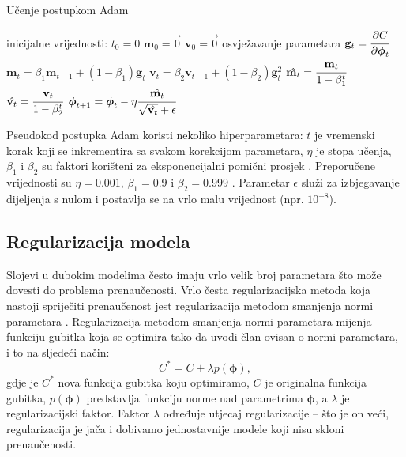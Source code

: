 \documentclass[times, utf8, diplomski, numeric]{fer}
\begin{document}
\begin{algorithm}[H]
\caption{Učenje postupkom Adam}
\label{alg:adam}
\begin{algorithmic}
\STATE inicijalne vrijednosti:
\STATE $t_0 = 0$ 
\STATE  $\mathbf{m}_0 = \vec{0}$
\STATE  $\mathbf{v}_0 = \vec{0}$
\STATE osvježavanje parametara
\STATE $\mathbf{g}_t = \cfrac{\partial C}{\partial \boldsymbol{\phi}_t}$
\STATE $\mathbf{m}_t = \beta_1 \mathbf{m}_{t-1} + (1 - \beta_1) \mathbf{g}_t$
\STATE $\mathbf{v}_t = \beta_2 \mathbf{v}_{t-1} + (1 - \beta_2) \mathbf{g}_t^2$
\STATE $\hat{\mathbf{m}_t} = \cfrac{\mathbf{m}_t}{1 - \beta_1^t}$
\STATE $\hat{\mathbf{v}_t} = \cfrac{\mathbf{v}_t}{1 - \beta_2^t}$
\STATE $\boldsymbol{\phi}_{t+1} = \boldsymbol{\phi}_t - \eta \cfrac{\hat{\mathbf{m}_t}}{\sqrt{\hat{\mathbf{v}_t}} + \epsilon}$
\end{algorithmic}
\end{algorithm}

Pseudokod postupka Adam koristi nekoliko hiperparametara: $t$ je vremenski korak koji se inkrementira sa svakom korekcijom parametara, $\eta$ je stopa učenja, $\beta_1$ i $\beta_2$ su faktori korišteni za
eksponencijalni pomični prosjek . Preporučene vrijednosti su $\eta=0.001$, $\beta_1=0.9$ i $\beta_2=0.999$ \citep{article:adam}.
Parametar $\epsilon$ služi za izbjegavanje dijeljenja s nulom i postavlja se na vrlo malu vrijednost (npr. $10^{-8}$).


\subsection{Regularizacija modela} \label{subsection:regularization}

Slojevi u dubokim modelima često imaju vrlo velik broj parametara što može dovesti do problema prenaučenosti.
Vrlo česta regularizacijska metoda koja nastoji spriječiti prenaučenost jest regularizacija metodom smanjenja normi parametara .
Regularizacija metodom smanjenja normi parametara mijenja funkciju gubitka koja se optimira tako da uvodi član ovisan o normi parametara, i to na sljedeći način:
\begin{equation}
 C^* = C + \lambda p(\boldsymbol{\phi}),
\end{equation}
gdje je $C^*$ nova funkcija gubitka koju optimiramo, $C$ je originalna funkcija gubitka, $p(\boldsymbol{\phi})$ predstavlja funkciju norme nad parametrima $\boldsymbol{\phi}$, a $\lambda$ je regularizacijski faktor.
Faktor $\lambda$ određuje utjecaj regularizacije -- što je on veći, regularizacija je jača i dobivamo jednostavnije modele koji nisu skloni prenaučenosti.
\end{document}
